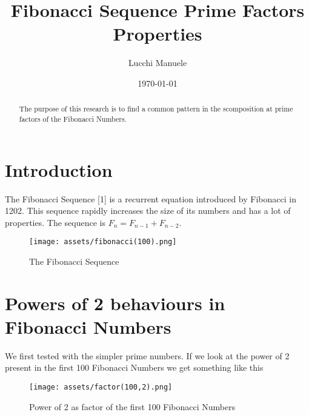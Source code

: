 \documentclass[amsmath,amssymb,aps,pra,reprint,groupedaddress,showpacs]{revtex4-1}
\begin{document}
 

\title{Fibonacci Sequence Prime Factors Properties}
 
\author{Lucchi Manuele}

\date{\today}

\begin{abstract}
The purpose of this research is to find a common pattern in the scomposition at prime factors of the Fibonacci Numbers.
\end{abstract} 
 
\maketitle

\section{Introduction}

The Fibonacci Sequence [1] is a recurrent equation introduced by Fibonacci in 1202. This sequence rapidly increases the size of its numbers and has a lot of properties.
The sequence is $F_n = F_{n-1} + F_{n-2}$.

\begin{figure}[H]
\centering
\texttt{[image: assets/fibonacci(100).png]}
\caption{The Fibonacci Sequence}
\end{figure} 

\section{Powers of 2 behaviours in Fibonacci Numbers}

We first tested with the simpler prime numbers. If we look at the power of 2 present in the first 100 Fibonacci Numbers we get something like this

\begin{figure}[H]
\centering
\texttt{[image: assets/factor(100,2).png]} %
\caption{Power of 2 as factor of the first 100 Fibonacci Numbers}
\end{figure}
\end{document}
